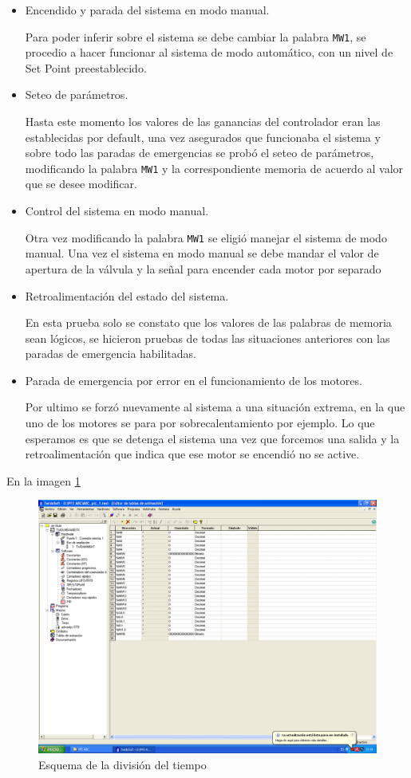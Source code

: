 \begin{itemize}
 \item Encendido y parada del sistema en modo manual.
 
 Para poder inferir sobre el sistema se debe cambiar la palabra \verb|MW1|, se procedio a
 hacer funcionar al sistema de modo automático, con un nivel de Set Point preestablecido.
 
 \item Seteo de parámetros.
 
 Hasta este momento los valores de las ganancias del controlador eran las establecidas por 
 default, una vez asegurados que funcionaba el sistema y sobre todo las paradas de emergencias
 se probó el seteo de parámetros, modificando la palabra \verb|MW1| y la correspondiente 
 memoria de acuerdo al valor que se desee modificar.
 
 \item Control del sistema en modo manual.
 
 Otra vez modificando la palabra \verb|MW1| se eligió manejar el sistema de modo manual.
 Una vez el sistema en modo manual se debe mandar el valor de apertura de la válvula y 
 la señal para encender cada motor por separado
 
 \item Retroalimentación del estado del sistema.
 
 En esta prueba solo se constato que los valores de las palabras de memoria sean lógicos,
 se hicieron pruebas de todas las situaciones anteriores con las paradas de emergencia 
 habilitadas.
 
 \item Parada de emergencia por error en el funcionamiento de los motores.
 
 Por ultimo se forzó nuevamente al sistema a una situación extrema, en la que uno
 de los motores se para por sobrecalentamiento por ejemplo. Lo que esperamos es que se
 detenga el sistema una vez que forcemos una salida y la retroalimentación que indica que
 ese motor se encendió no se active.
 
\end{itemize}

En la imagen \ref{img:twidosoftdebug}

\begin{figure}[ht!]
	\centering
	\includegraphics[scale=0.5]{Cap4-ProgramacionPLC/images/twidosoftdebug.png}
	\caption{Esquema de la división del tiempo}
	\label{img:twidosoftdebug}
\end{figure}